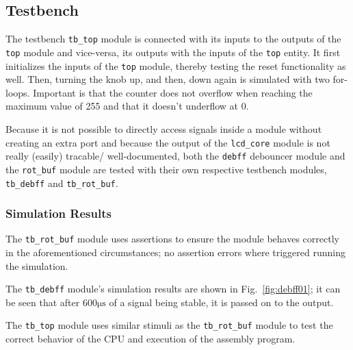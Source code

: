 \documentclass[a4paper,10pt]{scrartcl}
\begin{document}






\subsection{Testbench}
\label{sec:bench}


The testbench \texttt{tb\_top} module is connected with its inputs to
the outputs of the \texttt{top} module and vice-versa, its outputs
with the inputs of the \texttt{top} entity.  It first initializes the
inputs of the \texttt{top} module, thereby testing the reset
functionality as well.  Then, turning the knob up, and then, down
again is simulated with two for-loops.  Important is that the counter
does not overflow when reaching the maximum value of 255 and that it
doesn't underflow at 0.

Because it is not possible to directly access signals inside a module
without creating an extra port and because the output of the
\texttt{lcd\_core} module is not really (easily) tracable/
well-documented, both the \texttt{debff} debouncer module and the
\texttt{rot\_buf} module are tested with their own respective
testbench modules, \texttt{tb\_debff} and \texttt{tb\_rot\_buf}.









\subsubsection{Simulation Results}

The \texttt{tb\_rot\_buf} module uses assertions to ensure the module
behaves correctly in the aforementioned circumstances; no assertion
errors where triggered running the simulation.

The \texttt{tb\_debff} module's simulation results are shown in Fig.\
\ref{fig:debff01}; it can be seen that after $600 \mathrm{\mu s}$ of a
signal being stable, it is passed on to the output.

The \texttt{tb\_top} module uses similar stimuli as the
\texttt{tb\_rot\_buf} module to test the correct behavior of the CPU
and execution of the assembly program.
\end{document}
